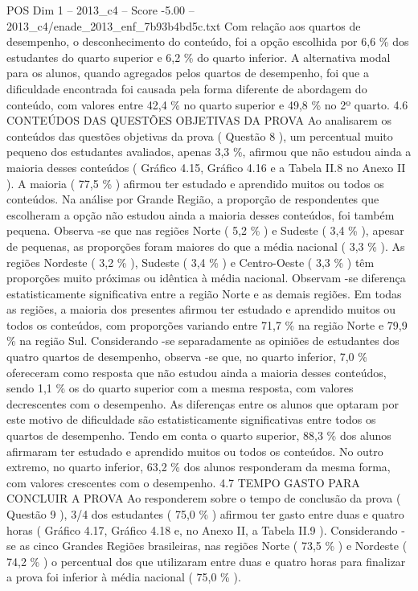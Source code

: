 \begin{textsample}{POS Dim 1 – 2013\_c4 – Score -5.00 – 2013\_c4/enade\_2013\_enf\_7b93b4bd5c.txt}
Com relação aos quartos de desempenho, o desconhecimento do conteúdo, foi a opção escolhida por 6,6 \% dos estudantes do quarto superior e 6,2 \% do quarto inferior.
A alternativa modal para os alunos, quando agregados pelos quartos de desempenho, foi que a dificuldade encontrada foi causada pela forma diferente de abordagem do conteúdo, com valores entre 42,4 \% no quarto superior e 49,8 \% no 2º quarto. 4.6 CONTEÚDOS DAS QUESTÕES OBJETIVAS DA PROVA Ao analisarem os conteúdos das questões objetivas da prova ( Questão 8 ), um percentual muito pequeno dos estudantes avaliados, apenas 3,3 \%, afirmou que não estudou ainda a maioria desses conteúdos ( Gráfico 4.15, Gráfico 4.16 e a Tabela II.8 no Anexo II ).
A maioria ( 77,5 \% ) afirmou ter estudado e aprendido muitos ou todos os conteúdos.
Na análise por Grande Região, a proporção de respondentes que escolheram a opção não estudou ainda a maioria desses conteúdos, foi também pequena.
Observa -se que nas regiões Norte ( 5,2 \% ) e Sudeste ( 3,4 \% ), apesar de pequenas, as proporções foram maiores do que a média nacional ( 3,3 \% ).
As regiões Nordeste ( 3,2 \% ), Sudeste ( 3,4 \% ) e Centro-Oeste ( 3,3 \% ) têm proporções muito próximas ou idêntica à média nacional.
Observam -se diferença estatisticamente significativa entre a região Norte e as demais regiões.
Em todas as regiões, a maioria dos presentes afirmou ter estudado e aprendido muitos ou todos os conteúdos, com proporções variando entre 71,7 \% na região Norte e 79,9 \% na região Sul.
Considerando -se separadamente as opiniões de estudantes dos quatro quartos de desempenho, observa -se que, no quarto inferior, 7,0 \% ofereceram como resposta que não estudou ainda a maioria desses conteúdos, sendo 1,1 \% os do quarto superior com a mesma resposta, com valores decrescentes com o desempenho.
As diferenças entre os alunos que optaram por este motivo de dificuldade são estatisticamente significativas entre todos os quartos de desempenho.
Tendo em conta o quarto superior, 88,3 \% dos alunos afirmaram ter estudado e aprendido muitos ou todos os conteúdos.
No outro extremo, no quarto inferior, 63,2 \% dos alunos responderam da mesma forma, com valores crescentes com o desempenho. 4.7 TEMPO GASTO PARA CONCLUIR A PROVA Ao responderem sobre o tempo de conclusão da prova ( Questão 9 ), 3/4 dos estudantes ( 75,0 \% ) afirmou ter gasto entre duas e quatro horas ( Gráfico 4.17, Gráfico 4.18 e, no Anexo II, a Tabela II.9 ).
Considerando -se as cinco Grandes Regiões brasileiras, nas regiões Norte ( 73,5 \% ) e Nordeste ( 74,2 \% ) o percentual dos que utilizaram entre duas e quatro horas para finalizar a prova foi inferior à média nacional ( 75,0 \% ).

\end{textsample}

